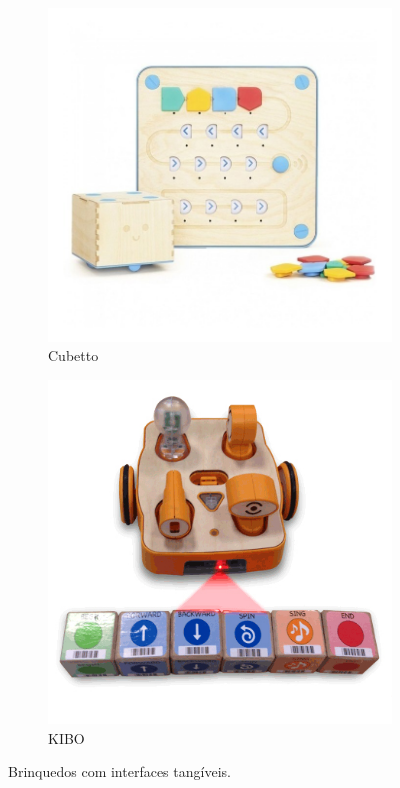 \begin{figure}[!htbp]
    \centering
    \begin{subfigure}{.5\textwidth}
        \centering
\includegraphics[width=.9\linewidth,fbox]{figs/cubetto.jpg}
        \caption{Cubetto}
        \label{fig_cubetto}
    \end{subfigure}%
    \begin{subfigure}{.5\textwidth}
        \centering
        \includegraphics[width=.9\linewidth,fbox]{figs/kibo_2.jpeg}
        \caption{KIBO}
        \label{fig_kibo}
    \end{subfigure}
    \caption{Brinquedos com interfaces tangíveis.}
    \label{fig_toys_tangible}
\end{figure}

